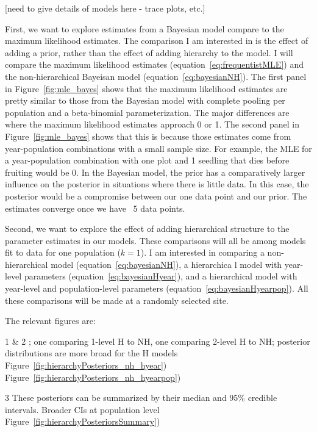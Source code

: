 \documentclass[12pt, oneside, titlepage]{article}   	%
\begin{document}
[need to give details of models here - trace plots, etc.]

First, we want to explore estimates from a Bayesian model compare to the maximum likelihood estimates. The comparison I am interested in is the effect of adding a prior, rather than the effect of adding hierarchy to the model. I will compare the maximum likelihood estimates (equation~\eqref{eq:frequentistMLE}) and the non-hierarchical Bayeisan model (equation~\eqref{eq:bayesianNH}). The first panel in Figure~\ref{fig:mle_bayes} shows that the maximum likelihood estimates are pretty similar to those from the Bayesian model with complete pooling per population and a beta-binomial parameterization. The major differences are where the maximum likelihood estimates approach 0 or 1. The second panel in Figure~\ref{fig:mle_bayes} shows that this is because those estimates come from year-population combinations with a small sample size. For example, the MLE for a year-population combination with one plot and 1 seedling that dies before fruiting would be 0. In the Bayesian model, the prior has a comparatively larger influence on the posterior in situations where there is little data. In this case, the posterior would be a compromise between our one data point and our prior. The estimates converge once we have ~5 data points.

Second, we want to explore the effect of adding hierarchical structure to the parameter estimates in our models. These comparisons will all be among models fit to data for one population ($k=1$). I am interested in comparing a non-hierarchical model (equation~\eqref{eq:bayesianNH}), a hierarchica l model with year-level parameters (equation~\eqref{eq:bayesianHyear}), and a hierarchical model with year-level and population-level parameters (equation~\eqref{eq:bayesianHyearpop}). All these comparisons will be made at a randomly selected site. 

The relevant figures are:

1 \& 2 ; one comparing 1-level H to NH, one comparing 2-level H to NH; posterior distributions are more broad for the H models Figure~\ref{fig:hierarchyPosteriors_nh_hyear}) Figure~\ref{fig:hierarchyPosteriors_nh_hyearpop})


3 These posteriors can be summarized by their median and 95\% credible intervals. Broader CIs at population level Figure~\ref{fig:hierarchyPosteriorsSummary})


 
\end{document}
